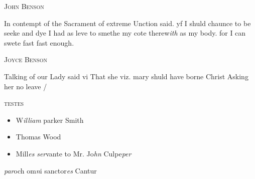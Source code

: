 \documentclass[12pt, a4paper]{book}
\begin{document}
            
            	
				\begin{center} \begin{large} {\scshape John Benson} \end{large} \end{center}
			

	
		\ifthenelse{\isodd{\thepage}}
		{\reversemarginpar}
		{\normalmarginpar}
		In contempt of the Sacrament of extreme Unction
 said. yf I shuld chaunce to be seeke and dye
 I had as leve to smethe my cote therew\textit{ith}
	as my body. for I can swete fast fast
			 enough.

            
            
            	
				\begin{center} \begin{large} {\scshape Joyce Benson} \end{large} \end{center}
			

		\ifthenelse{\isodd{\thepage}}
		{\reversemarginpar}
		{\normalmarginpar}
		Talking of our Lady said vi That she viz. mary
 shuld have borne Christ Asking her no leave /
 

	\begin{center} {\scshape testes} \end{center}\begin{itemize}
		
		\item[]W\textit{illiam} parker Smith
		\item[]Thomas Wood
		\item[]Mill\textit{es} \textit{ser}vante to Mr. Jo\textit{hn }Culpe\textit{per}
	\end{itemize}
	
		\ifthenelse{\isodd{\thepage}}
		{\reversemarginpar}
		{\normalmarginpar}
		\textit{par}och om\textit{n}i sanctor\textit{es} Cantur

            
            
\dotfill
					  \subsection*{}  \subsection*{}  \subsection*{}  \subsection*{}
\end{document}
